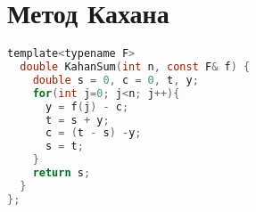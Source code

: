 \section{Метод Кахана}
\begin{lstlisting}[language=C]
  template<typename F>
  double KahanSum(int n, const F& f) {
    double s = 0, c = 0, t, y;
    for(int j=0; j<n; j++){
      y = f(j) - c;
      t = s + y;
      c = (t - s) -y;
      s = t;
    }
    return s;
  }
};

\end{lstlisting}
